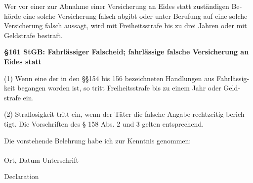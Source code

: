 \begin{otherlanguage}{ngerman}
\noindent Wer vor einer zur Abnahme einer Versicherung an Eides statt zuständigen Behörde eine solche Versicherung
falsch abgibt oder unter Berufung auf eine solche Versicherung falsch aussagt, wird mit Freiheitsstrafe bis zu drei
Jahren oder mit Geldstrafe bestraft.

\textbf{\S 161 StGB: Fahrlässiger Falscheid; fahrlässige falsche Versicherung an Eides statt}

\noindent(1) Wenn eine der in den \S\S 154 bis 156 bezeichneten Handlungen aus Fahrlässigkeit begangen worden ist, so tritt Freiheitsstrafe bis zu einem Jahr oder Geldstrafe ein.

\noindent (2) Straflosigkeit tritt ein, wenn der Täter die falsche Angabe rechtzeitig berichtigt. Die Vorschriften des § 158 Abs. 2 und 3 gelten entsprechend.

\noindent Die vorstehende Belehrung habe ich zur Kenntnis genommen:\vspace{0.4cm}\\
\noindent\field[30ex]{\Place, \Date} \hspace{15ex} \field[30ex]{\Signature}\\
\phantom{}\hspace{8ex} Ort, Datum  \hspace{35.5ex} Unterschrift \vspace{0.1cm}\newpage
\end{otherlanguage}


\begin{center} {\LARGE Declaration} \end{center}

